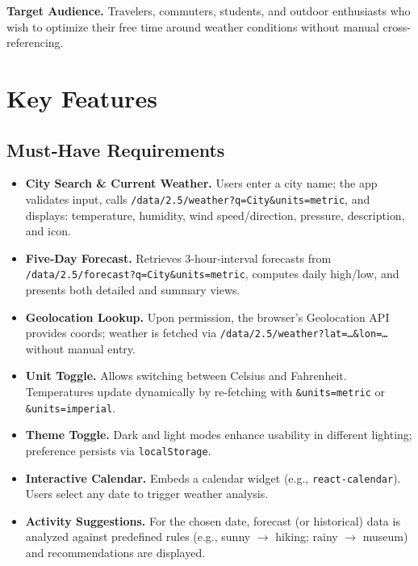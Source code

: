 \documentclass[12pt,a4paper]{article}
\begin{document}
\textbf{Target Audience.}  
Travelers, commuters, students, and outdoor enthusiasts who wish to optimize their free time around weather conditions without manual cross-referencing.


\section{Key Features}
\subsection*{Must‐Have Requirements}
\begin{itemize}[nosep]
  \item \textbf{City Search \& Current Weather.}  
    Users enter a city name; the app validates input, calls 
    \texttt{/data/2.5/weather?q=City\&units=metric}, and displays: temperature, humidity, wind speed/direction, pressure, description, and icon.

  \item \textbf{Five‐Day Forecast.}  
    Retrieves 3-hour‐interval forecasts from 
    \texttt{/data/2.5/forecast?q=City\&units=metric}, computes daily high/low,
    and presents both detailed and summary views.

  \item \textbf{Geolocation Lookup.}  
    Upon permission, the browser’s Geolocation API provides coords; weather
    is fetched via 
    \texttt{/data/2.5/weather?lat=\dots\&lon=\dots} without manual entry.

  \item \textbf{Unit Toggle.}  
    Allows switching between Celsius and Fahrenheit. Temperatures update
    dynamically by re-fetching with \texttt{\&units=metric} or 
    \texttt{\&units=imperial}.

  \item \textbf{Theme Toggle.}  
    Dark and light modes enhance usability in different lighting; preference
    persists via \texttt{localStorage}.

  \item \textbf{Interactive Calendar.}  
    Embeds a calendar widget (e.g., \texttt{react-calendar}). Users select any
    date to trigger weather analysis.

  \item \textbf{Activity Suggestions.}  
    For the chosen date, forecast (or historical) data is analyzed against
    predefined rules (e.g., sunny $\rightarrow$ hiking; rainy $\rightarrow$
    museum) and recommendations are displayed.


\end{itemize}
\end{document}
